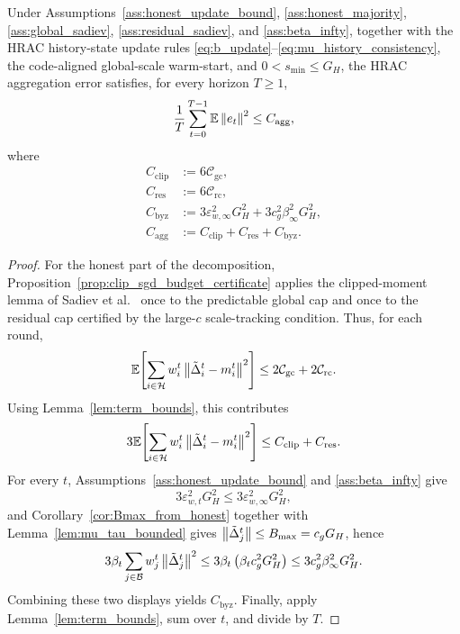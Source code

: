 \begin{proposition}
\label{prop:tight_floor_beta2}
Under Assumptions~\ref{ass:honest_update_bound},
\ref{ass:honest_majority}, \ref{ass:global_sadiev},
\ref{ass:residual_sadiev}, and \ref{ass:beta_infty}, together with the HRAC
history-state update rules \eqref{eq:b_update}--\eqref{eq:mu_history_consistency},
the code-aligned global-scale warm-start, and \(0<s_{\min}\le G_H\),
the HRAC
aggregation error satisfies, for every horizon \(T\ge 1\),
\begin{equation}
    \frac1T\sum_{t=0}^{T-1}\mathbb{E}\left\lVert e_t \right\rVert^2
    \le
    C_{\mathrm{agg}},
    \label{eq:agg_error_average}
\end{equation}
where
\begin{align}
    C_{\mathrm{clip}}
    &:=
    6\mathcal C_{\mathrm{gc}},
    \label{eq:C_clip}\\
    C_{\mathrm{res}}
    &:=
    6\mathcal C_{\mathrm{rc}},
    \label{eq:C_res}\\
    C_{\mathrm{byz}}
    &:=
    3\varepsilon_{w,\infty}^2G_H^2
    +
    3c_g^2\beta_\infty^2G_H^2,
    \label{eq:C_byz}\\
    C_{\mathrm{agg}}
    &:=
    C_{\mathrm{clip}}+C_{\mathrm{res}}+C_{\mathrm{byz}}.
    \label{eq:C_agg}
\end{align}
\end{proposition}

\begin{proof}
For the honest part of the decomposition, Proposition~\ref{prop:clip_sgd_budget_certificate}
applies the clipped-moment lemma of
Sadiev et al.~\cite[Lemma~5.1]{sadiev2023highprob} once to the predictable global cap and
once to the residual cap certified by the large-\(c\) scale-tracking condition.
Thus, for each round,
\[
    \mathbb{E}\!\left[
        \sum_{i\in\mathcal{H}} w_i^t\left\lVert \tilde{\Delta}_i^t-m_i^t \right\rVert^2
    \right]
    \le
    2\mathcal C_{\mathrm{gc}}+2\mathcal C_{\mathrm{rc}}.
\]
Using Lemma~\ref{lem:term_bounds}, this contributes
\[
    3\mathbb{E}\!\left[
        \sum_{i\in\mathcal{H}} w_i^t\left\lVert \tilde{\Delta}_i^t-m_i^t \right\rVert^2
    \right]
    \le
    C_{\mathrm{clip}}+C_{\mathrm{res}}.
\]
For every \(t\), Assumptions~\ref{ass:honest_update_bound} and
\ref{ass:beta_infty} give
\[
    3\varepsilon_{w,t}^2G_H^2
    \le
    3\varepsilon_{w,\infty}^2G_H^2,
\]
and Corollary~\ref{cor:Bmax_from_honest} together with
Lemma~\ref{lem:mu_tau_bounded} gives
\(\left\lVert \tilde\Delta_j^t \right\rVert\le B_{\max}=c_gG_H\), hence
\[
    3\beta_t \sum_{j\in\mathcal{B}} w_j^t \left\lVert \tilde{\Delta}_j^t \right\rVert^2
    \le
    3\beta_t\left(\beta_t c_g^2G_H^2\right)
    \le
    3c_g^2\beta_\infty^2 G_H^2.
\]
Combining these two displays yields \(C_{\mathrm{byz}}\). Finally, apply
Lemma~\ref{lem:term_bounds}, sum over \(t\), and divide by \(T\).
\end{proof}

